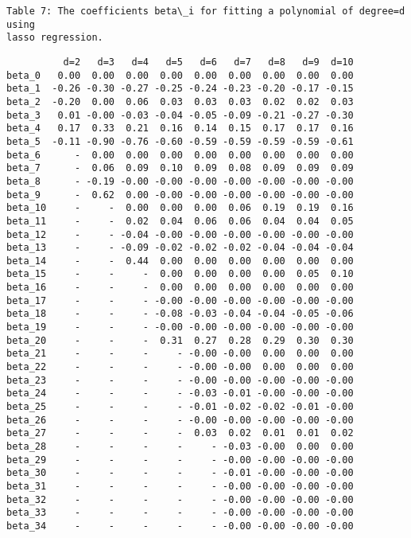 \documentclass[11pt]{article}
\begin{document}
    \begin{Verbatim}[commandchars=\\\{\}]
Table 7: The coefficients beta\_i for fitting a polynomial of degree=d using
lasso regression.
    \end{Verbatim}

    
    \begin{verbatim}
          d=2   d=3   d=4   d=5   d=6   d=7   d=8   d=9  d=10
beta_0   0.00  0.00  0.00  0.00  0.00  0.00  0.00  0.00  0.00
beta_1  -0.26 -0.30 -0.27 -0.25 -0.24 -0.23 -0.20 -0.17 -0.15
beta_2  -0.20  0.00  0.06  0.03  0.03  0.03  0.02  0.02  0.03
beta_3   0.01 -0.00 -0.03 -0.04 -0.05 -0.09 -0.21 -0.27 -0.30
beta_4   0.17  0.33  0.21  0.16  0.14  0.15  0.17  0.17  0.16
beta_5  -0.11 -0.90 -0.76 -0.60 -0.59 -0.59 -0.59 -0.59 -0.61
beta_6      -  0.00  0.00  0.00  0.00  0.00  0.00  0.00  0.00
beta_7      -  0.06  0.09  0.10  0.09  0.08  0.09  0.09  0.09
beta_8      - -0.19 -0.00 -0.00 -0.00 -0.00 -0.00 -0.00 -0.00
beta_9      -  0.62  0.00 -0.00 -0.00 -0.00 -0.00 -0.00 -0.00
beta_10     -     -  0.00  0.00  0.00  0.06  0.19  0.19  0.16
beta_11     -     -  0.02  0.04  0.06  0.06  0.04  0.04  0.05
beta_12     -     - -0.04 -0.00 -0.00 -0.00 -0.00 -0.00 -0.00
beta_13     -     - -0.09 -0.02 -0.02 -0.02 -0.04 -0.04 -0.04
beta_14     -     -  0.44  0.00  0.00  0.00  0.00  0.00  0.00
beta_15     -     -     -  0.00  0.00  0.00  0.00  0.05  0.10
beta_16     -     -     -  0.00  0.00  0.00  0.00  0.00  0.00
beta_17     -     -     - -0.00 -0.00 -0.00 -0.00 -0.00 -0.00
beta_18     -     -     - -0.08 -0.03 -0.04 -0.04 -0.05 -0.06
beta_19     -     -     - -0.00 -0.00 -0.00 -0.00 -0.00 -0.00
beta_20     -     -     -  0.31  0.27  0.28  0.29  0.30  0.30
beta_21     -     -     -     - -0.00 -0.00  0.00  0.00  0.00
beta_22     -     -     -     - -0.00 -0.00  0.00  0.00  0.00
beta_23     -     -     -     - -0.00 -0.00 -0.00 -0.00 -0.00
beta_24     -     -     -     - -0.03 -0.01 -0.00 -0.00 -0.00
beta_25     -     -     -     - -0.01 -0.02 -0.02 -0.01 -0.00
beta_26     -     -     -     - -0.00 -0.00 -0.00 -0.00 -0.00
beta_27     -     -     -     -  0.03  0.02  0.01  0.01  0.02
beta_28     -     -     -     -     - -0.03 -0.00  0.00  0.00
beta_29     -     -     -     -     - -0.00 -0.00 -0.00 -0.00
beta_30     -     -     -     -     - -0.01 -0.00 -0.00 -0.00
beta_31     -     -     -     -     - -0.00 -0.00 -0.00 -0.00
beta_32     -     -     -     -     - -0.00 -0.00 -0.00 -0.00
beta_33     -     -     -     -     - -0.00 -0.00 -0.00 -0.00
beta_34     -     -     -     -     - -0.00 -0.00 -0.00 -0.00

\end{verbatim}
\end{document}
